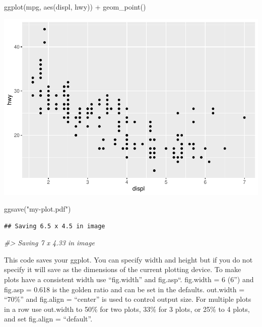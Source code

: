 \documentclass[
]{article}
\newenvironment{Shaded}{\begin{snugshade}}{\end{snugshade}}
\newcommand{\CommentTok}[1]{\textcolor[rgb]{0.56,0.35,0.01}{\textit{#1}}}
\newcommand{\FunctionTok}[1]{\textcolor[rgb]{0.00,0.00,0.00}{#1}}
\newcommand{\NormalTok}[1]{#1}
\newcommand{\SpecialCharTok}[1]{\textcolor[rgb]{0.00,0.00,0.00}{#1}}
\newcommand{\StringTok}[1]{\textcolor[rgb]{0.31,0.60,0.02}{#1}}
\begin{document}
\begin{Shaded}
\begin{Highlighting}[]
\FunctionTok{ggplot}\NormalTok{(mpg, }\FunctionTok{aes}\NormalTok{(displ, hwy)) }\SpecialCharTok{+} \FunctionTok{geom\_point}\NormalTok{()}
\end{Highlighting}
\end{Shaded}

\includegraphics{Assignments_files/figure-latex/unnamed-chunk-73-1.pdf}

\begin{Shaded}
\begin{Highlighting}[]
\FunctionTok{ggsave}\NormalTok{(}\StringTok{"my{-}plot.pdf"}\NormalTok{)}
\end{Highlighting}
\end{Shaded}

\begin{verbatim}
## Saving 6.5 x 4.5 in image
\end{verbatim}

\begin{Shaded}
\begin{Highlighting}[]
\CommentTok{\#\textgreater{} Saving 7 x 4.33 in image}
\end{Highlighting}
\end{Shaded}

This code saves your ggplot. You can specify width and height but if you
do not specify it will save as the dimensions of the current plotting
device. To make plots have a consistent width use ``fig.width'' and
fig.asp``. fig.width = 6 (6'') and fig.asp = 0.618 is the golden ratio
and can be set in the defaults. out.width = ``70\%'' and fig.align =
``center'' is used to control output size. For multiple plots in a row
use out.width to 50\% for two plots, 33\% for 3 plots, or 25\% to 4
plots, and set fig.align = ``default''.
\end{document}

